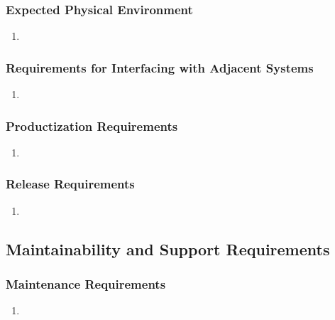 \documentclass[]{article}
\begin{document}
\subsubsection{Expected Physical Environment}
\label{ssub:expected_physical_environment}
\begin{enumerate}[{OE-EPE}1. ]
	\item 
\end{enumerate}

\subsubsection{Requirements for Interfacing with Adjacent Systems}
\label{ssub:requirements_for_interfacing_with_adjacent_systems}
\begin{enumerate}[{OE-IA}1. ]
	\item 
\end{enumerate}

\subsubsection{Productization Requirements}
\label{ssub:productization_requirements}
\begin{enumerate}[{OE-P}1. ]
	\item 
\end{enumerate}

\subsubsection{Release Requirements}
\label{ssub:release_requirements}
\begin{enumerate}[{OE-R}1. ]
	\item 
\end{enumerate}


\subsection{Maintainability and Support Requirements}
\label{sub:maintainability_and_support_requirements}

\subsubsection{Maintenance Requirements}
\label{ssub:maintenance_requirements}
\begin{enumerate}[{MS-M}1. ]
	\item 
\end{enumerate}
\end{document}
